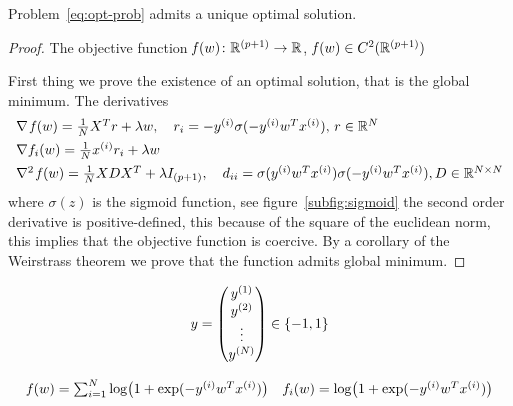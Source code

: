 \begin{prop}
Problem~\eqref{eq:opt-prob} admits a unique optimal solution.
\end{prop}

\begin{proof}
The objective function $\operatorname*{\mathit{f}}(w)\colon\mathbb{R}^{(p+1)}\to\mathbb{R}$, $\operatorname*{\mathit{f}}(w)\in C^2(\mathbb{R}^{(p+1)})$

First thing we prove the existence of an optimal solution, that is the global minimum. The derivatives
\[
\begin{array}{@{}l@{}}
\nabla\func(w)=\frac{1}{N}X^Tr+\lambda w,\quad r_i=-y^{(i)}\sigma(-y^{(i)}w^Tx^{(i)}),\,r\in\R^N \\[1ex]
\nabla f_i(w)=\frac{1}{N}x^{(i)}r_i+\lambda w \\[1ex]
\nabla^2\func(w)=\frac{1}{N}XDX^T+\lambda I_{(p+1)},\quad d_{ii}=\sigma(y^{(i)}w^Tx^{(i)})\sigma(-y^{(i)}w^Tx^{(i)}),D\in\R^{N\times N}
\end{array}
\]
where $\sigma(z)$ is the sigmoid function, see figure~\vref{subfig:sigmoid}
the second order derivative is positive-defined, this because of the square of the euclidean norm, this implies that the objective function is coercive. By a corollary of the Weirstrass theorem we prove that the function admits global minimum.


\end{proof}




\[
y=
\begin{pmatrix}
y^{(1)} \\ y^{(2)} \\ \vdots \\ y^{(N)}
\end{pmatrix}\in\{-1,1\}
\]

\[
\begin{array}{ll}
\operatorname*{\mathit{f}}(w)=\sum_{i=1}^N\log\bigl(1+\exp(-y^{(i)}w^Tx^{(i)})\bigr) & f_i(w)=\log\bigl(1+\exp(-y^{(i)}w^Tx^{(i)})\bigr)
\end{array}
\]

\cleardoublepage

